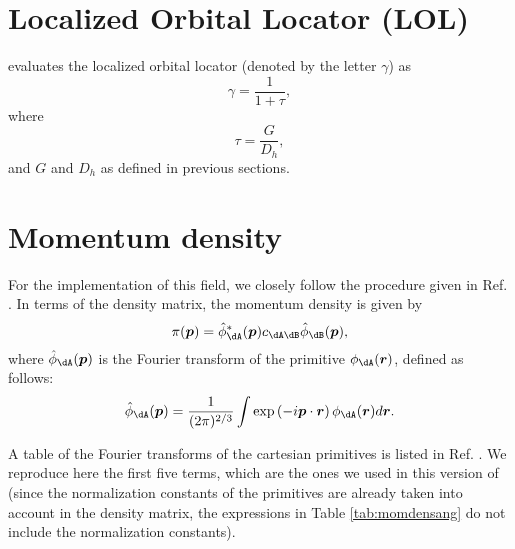 \section{Localized Orbital Locator (LOL)}

\DTK{} evaluates the localized orbital locator (denoted by the letter $\gamma$) as
%
\begin{equation}
   \gamma=\frac{1}{1+\tau},
\end{equation}
%
where
%
\begin{equation}
   \tau=\frac{G}{D_h},
\end{equation}
%
and $G$ and $D_h$ as defined in previous sections.

\section{Momentum density}
For the implementation of this field, we closely follow the procedure given in Ref. \cite{bib:kaijser1977}. In terms of the density matrix, the momentum density is given by
%
\begin{equation}\label{eq:momdensdef}
   \pi(\boldsymbol{p})=\hat{\phi}_{\dA}^*(\boldsymbol{p})c_{\dA\dB}\hat{\phi}_{\dB}(\boldsymbol{p}),
\end{equation}
%
where $\hat{\phi}_{\dA}(\boldsymbol{p})$ is the Fourier transform of the primitive $\phi_{\dA}(\boldsymbol{r})$, defined as follows:
%
\begin{equation}
   \hat{\phi}_{\dA}(\boldsymbol{p})=\frac{1}{(2\pi)^{2/3}}\int\exp\left(-i\boldsymbol{p}\cdot\boldsymbol{r}\right)\phi_{\dA}(\boldsymbol{r})d\boldsymbol{r}.
\end{equation}
%

A table of the Fourier transforms of the cartesian primitives is listed in Ref. \cite{bib:kaijser1977}. We reproduce here the first five terms, which are the ones we used in this version of \DTK{} (since the normalization constants of the primitives are already taken into account in the density matrix, the expressions in Table \ref{tab:momdensang} do not include the normalization constants).

